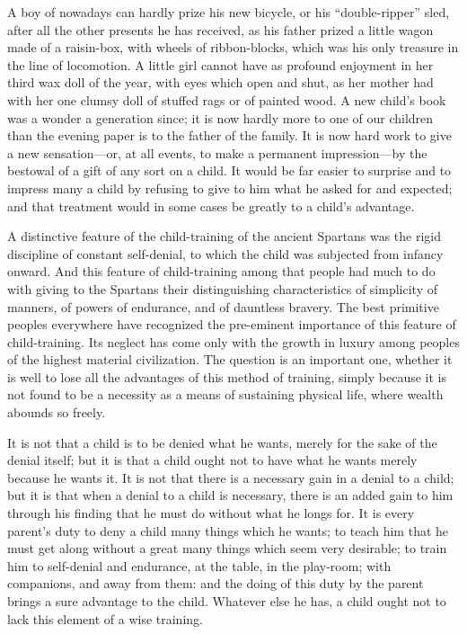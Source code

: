 \documentclass[
]{book}
\begin{document}
A boy of nowadays can hardly prize his new bicycle, or his ``double-ripper'' sled, after all the other presents he has received, as his father prized a little wagon made of a raisin-box, with wheels of ribbon-blocks, which was his only treasure in the line of locomotion. A little girl cannot have as profound enjoyment in her third wax doll of the year, with eyes which open and shut, as her mother had with her one clumsy doll of stuffed rags or of painted wood. A new child's book was a wonder a generation since; it is now hardly more to one of our children than the evening paper is to the father of the family. It is now hard work to give a new sensation---or, at all events, to make a permanent impression---by the bestowal of a gift of any sort on a child. It would be far easier to surprise and to impress many a child by refusing to give to him what he asked for and expected; and that treatment would in some cases be greatly to a child's advantage.

A distinctive feature of the child-training of the ancient Spartans was the rigid discipline of constant self-denial, to which the child was subjected from infancy onward. And this feature of child-training among that people had much to do with giving to the Spartans their distinguishing characteristics of simplicity of manners, of powers of endurance, and of dauntless bravery. The best primitive peoples everywhere have recognized the pre-eminent importance of this feature of child-training. Its neglect has come only with the growth in luxury among peoples of the highest material civilization. The question is an important one, whether it is well to lose all the advantages of this method of training, simply because it is not found to be a necessity as a means of sustaining physical life, where wealth abounds so freely.

It is not that a child is to be denied what he wants, merely for the sake of the denial itself; but it is that a child ought not to have what he wants merely because he wants it. It is not that there is a necessary gain in a denial to a child; but it is that when a denial to a child is necessary, there is an added gain to him through his finding that he must do without what he longs for. It is every parent's duty to deny a child many things which he wants; to teach him that he must get along without a great many things which seem very desirable; to train him to self-denial and endurance, at the table, in the play-room; with companions, and away from them: and the doing of this duty by the parent brings a sure advantage to the child. Whatever else he has, a child ought not to lack this element of a wise training.
\end{document}

